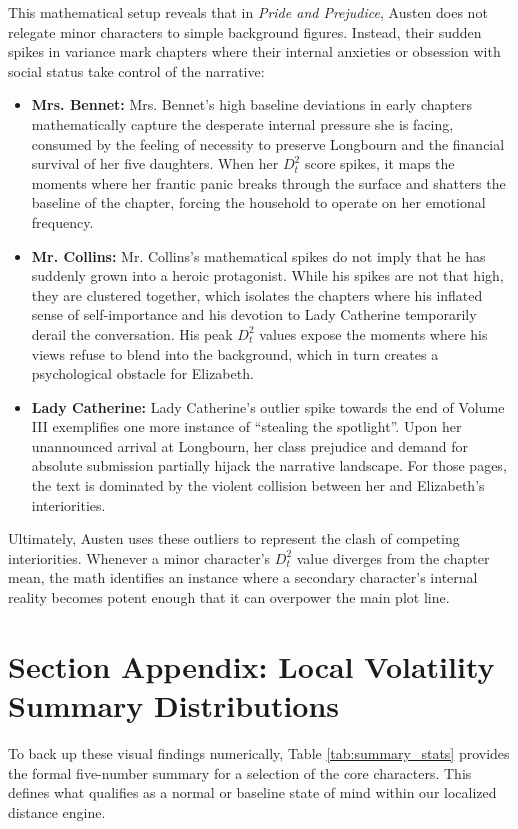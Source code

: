This mathematical setup reveals that in \textit{Pride and Prejudice}, Austen does not relegate minor characters to simple background figures. Instead, their sudden spikes in variance mark chapters where their internal anxieties or obsession with social status take control of the narrative:
\begin{itemize}
    \item \textbf{Mrs. Bennet:} Mrs. Bennet’s high baseline deviations in early chapters mathematically capture the desperate internal pressure she is facing, consumed by the feeling of necessity to preserve Longbourn and the financial survival of her five daughters. When her $D_t^2$ score spikes, it maps the moments where her frantic panic breaks through the surface and shatters the baseline of the chapter, forcing the household to operate on her emotional frequency.
    \item \textbf{Mr. Collins:} Mr. Collins’s mathematical spikes do not imply that he has suddenly grown into a heroic protagonist. While his spikes are not that high, they are clustered together, which isolates the chapters where his inflated sense of self-importance and his devotion to Lady Catherine temporarily derail the conversation. His peak $D_t^2$ values expose the moments where his views refuse to blend into the background, which in turn creates a psychological obstacle for Elizabeth.
    \item \textbf{Lady Catherine:} Lady Catherine’s outlier spike towards the end of Volume III exemplifies one more instance of ``stealing the spotlight''. Upon her unannounced arrival at Longbourn, her class prejudice and demand for absolute submission partially hijack the narrative landscape. For those pages, the text is dominated by the violent collision between her and Elizabeth’s interiorities.
\end{itemize}
Ultimately, Austen uses these outliers to represent the clash of competing interiorities. Whenever a minor character's $D_t^2$ value diverges from the chapter mean, the math identifies an instance where a secondary character's internal reality becomes potent enough that it can overpower the main plot line.

\section{Section Appendix: Local Volatility Summary Distributions}
To back up these visual findings numerically, Table \ref{tab:summary_stats} provides the formal five-number summary for a selection of the core characters. This defines what qualifies as a normal or baseline state of mind within our localized distance engine.

